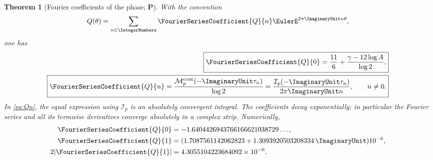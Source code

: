 \documentclass[11pt,oneside]{article}
\newtheorem{theorem}{Theorem}[section]
\theoremstyle{definition}
\theoremstyle{remark}
\newcommand{\Ical}{\mathcal I}
\newcommand{\Mcal}{\mathcal M}
\newcommand{\statusP}{\textcolor{deepgreen}{\textbf{P}}}
\begin{document}
\begin{theorem}[Fourier coefficients of the phase; \statusP]
\label{thm:Q-Fourier}
With the convention
\begin{equation}
 Q(\theta)=\sum_{n\in\IntegerNumbers}\FourierSeriesCoefficient{Q}{n}\EulerE^{2\pi\ImaginaryUnit n\theta},
 \label{eq:Q-Fourier-series}
\end{equation}
one has
\begin{align}
 \boxed{
 \FourierSeriesCoefficient{Q}{0}
 =\frac{11}{6}+\frac{\gamma-12\log A}{\log2},}
 \label{eq:Q0}\\
 \boxed{
 \FourierSeriesCoefficient{Q}{n}
 =\frac{\Mcal_p^{\mathrm{cont}}(-\ImaginaryUnit\tau_n)}{\log2}
 =\frac{\Ical_p(-\ImaginaryUnit\tau_n)}{2\pi\ImaginaryUnit n},
 \qquad n\ne0.}
 \label{eq:Qn}
\end{align}
In \eqref{eq:Qn}, the equal expression using $\Ical_p$ is an absolutely
convergent integral.
The coefficients decay exponentially; in particular the Fourier series and
all its termwise derivatives converge absolutely in a complex strip.
Numerically,
\begin{align}
 \FourierSeriesCoefficient{Q}{0}&=-1.6404426943766166621038729\ldots,
 \label{eq:Q0-num}\\
 \FourierSeriesCoefficient{Q}{1}&=
 (1.7087561142062823+1.3093920503208334\,\ImaginaryUnit)10^{-6},
 \label{eq:Q1-num}\\
 2|\FourierSeriesCoefficient{Q}{1}|&=4.3055104223684092\times10^{-6}.
 \label{eq:Q1-amplitude}
\end{align}
\end{theorem}
\end{document}
